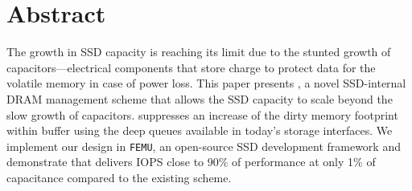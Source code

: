 \section*{Abstract}
The growth in SSD capacity is reaching its limit 
due to the stunted growth of capacitors---electrical components that store charge 
to protect data for the volatile memory in case of power loss. 
This paper presents \ours{}, a novel SSD-internal DRAM management scheme 
that allows the SSD capacity to scale beyond the slow growth of capacitors. 
\ours{} suppresses an increase of the dirty memory footprint within buffer 
using the deep queues available in today's storage interfaces.
We implement our design in \texttt{FEMU}, an open-source SSD development framework
and demonstrate that \ours{} delivers IOPS close to 90\% of performance at only 1\% of capacitance compared to the existing scheme. 
